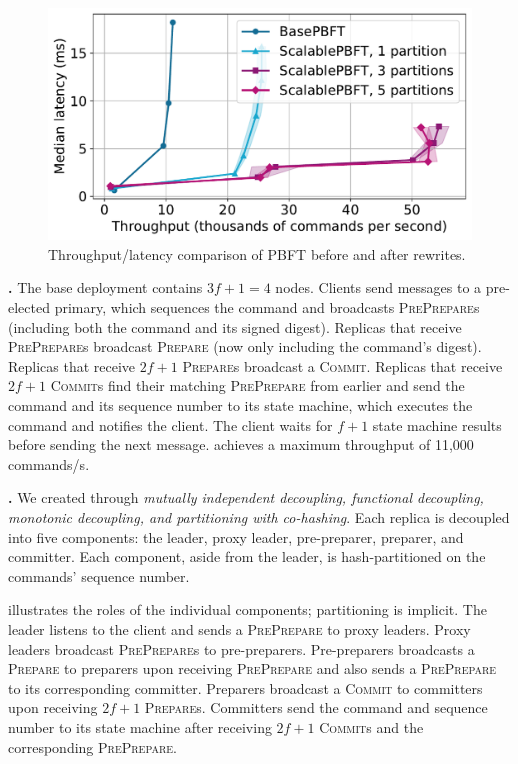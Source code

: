 \begin{figure}[t]
    \centering
    \includegraphics[width=0.6\linewidth]{assets/pbft_lt.pdf}
    \caption{Throughput/latency comparison of PBFT before and after rewrites.}
    \label{fig:throughput}
\end{figure}

\textbf{\BasePBFT{}.}
The base deployment contains $3f+1 = 4$ nodes.
Clients send messages to a pre-elected primary, which sequences the command and broadcasts \textsc{PrePrepare}s (including both the command and its signed digest).
Replicas that receive \textsc{PrePrepare}s broadcast \textsc{Prepare} (now only including the command's digest).
Replicas that receive $2f+1$ \textsc{Prepare}s broadcast a \textsc{Commit}.
Replicas that receive $2f+1$ \textsc{Commit}s find their matching \textsc{PrePrepare} from earlier and send the command and its sequence number to its state machine, which executes the command and notifies the client.
The client waits for $f+1$ state machine results before sending the next message.
\BasePBFT{} achieves a maximum throughput of 11,000 commands/s.


\textbf{\ScalablePBFT{}.}
We created \ScalablePBFT{} through \textit{mutually independent decoupling, functional decoupling, monotonic decoupling, and partitioning with co-hashing}.
Each replica is decoupled into five components: the leader, proxy leader, pre-preparer, preparer, and committer.
Each component, aside from the leader, is hash-partitioned on the commands' sequence number.

 illustrates the roles of the individual components; partitioning is implicit.
The leader listens to the client and sends a \textsc{PrePrepare} to proxy leaders.
Proxy leaders broadcast \textsc{PrePrepare}s to pre-preparers.
Pre-preparers broadcasts a \textsc{Prepare} to preparers upon receiving \textsc{PrePrepare} and also sends a \textsc{PrePrepare} to its corresponding committer.
Preparers broadcast a \textsc{Commit} to committers upon receiving $2f+1$ \textsc{Prepare}s.
Committers send the command and sequence number to its state machine after receiving $2f+1$ \textsc{Commit}s and the corresponding \textsc{PrePrepare}.

